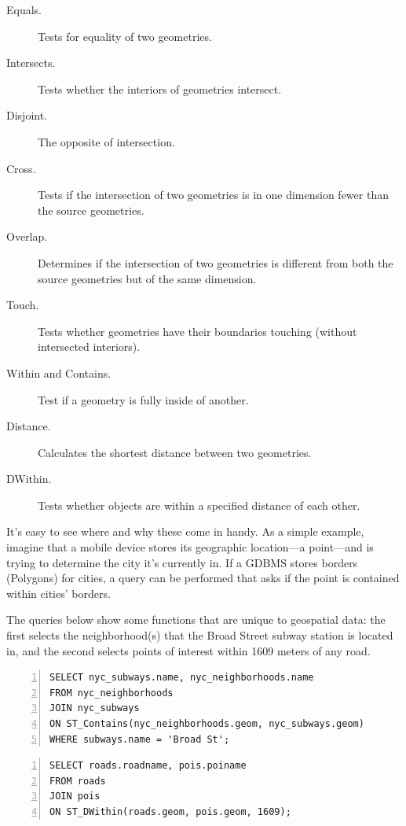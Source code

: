 \begin{description}
  \item[Equals.] Tests for equality of two geometries.
  \item[Intersects.] Tests whether the interiors of geometries intersect.
  \item[Disjoint.] The opposite of intersection.
  \item[Cross.] Tests if the intersection of two geometries is in one dimension fewer than the source geometries.
  \item[Overlap.] Determines if the intersection of two geometries is different from both the source geometries but of the same dimension.
  \item[Touch.] Tests whether geometries have their boundaries touching (without intersected interiors).
  \item[Within and Contains.] Test if a geometry is fully inside of another.
  \item[Distance.] Calculates the shortest distance between two geometries.
  \item[DWithin.] Tests whether objects are within a specified distance of each other.
\end{description}

It's easy to see where and why these come in handy. As a simple example, imagine that a mobile device stores its geographic location---a point---and is trying to determine the city it's currently in. If a GDBMS stores borders (Polygons) for cities, a query can be performed that asks if the point is contained within cities' borders.

The queries below show some functions that are unique to geospatial data: the first selects the neighborhood(s) that the Broad Street subway station is located in, and the second selects points of interest within 1609 meters of any road.

\begin{Verbatim}[samepage=true,baselinestretch=1,numbers=left,xleftmargin=12mm]
SELECT nyc_subways.name, nyc_neighborhoods.name
FROM nyc_neighborhoods
JOIN nyc_subways
ON ST_Contains(nyc_neighborhoods.geom, nyc_subways.geom)
WHERE subways.name = 'Broad St';
\end{Verbatim}

\begin{Verbatim}[samepage=true,baselinestretch=1,numbers=left,xleftmargin=12mm]
SELECT roads.roadname, pois.poiname
FROM roads
JOIN pois 
ON ST_DWithin(roads.geom, pois.geom, 1609);
\end{Verbatim}

